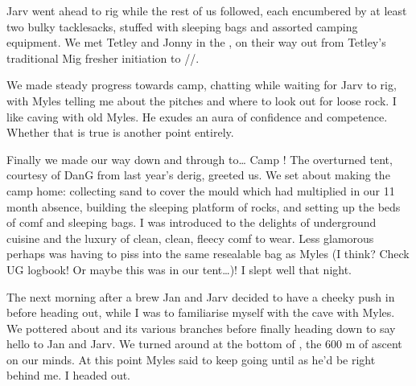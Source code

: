 
Jarv went ahead to rig while the rest of us followed, each encumbered by
at least two bulky tacklesacks, stuffed with sleeping bags and assorted
camping equipment. We met Tetley and Jonny in the ,
on their way out from Tetley's traditional Mig fresher initiation to
//.


We made steady progress towards camp, chatting while waiting for Jarv to
rig, with Myles telling me about the pitches and where to look out for
loose rock. I like caving with old Myles. He exudes an aura of
confidence and competence. Whether that is true is another point
entirely.

Finally we made our way down  and through  to\ldots{} Camp ! The overturned tent, courtesy of
DanG from last year's derig, greeted us. We set about making the camp
home: collecting sand to cover the mould which had multiplied in our 11
month absence, building the sleeping platform of rocks, and setting up
the beds of comf and sleeping bags. I was introduced to the delights of
underground cuisine and the luxury of clean, clean, fleecy comf to wear.
Less glamorous perhaps was having to piss into the same resealable bag
as Myles (I think? Check UG logbook! Or maybe this was in our
tent\ldots{})! I slept well that night.



The next morning after a brew Jan and Jarv decided to have a cheeky push
in  before heading out, while I was to familiarise
myself with the cave with Myles. We pottered about 
and its various branches before finally heading down 
to say hello to Jan and Jarv. We turned around at the bottom of , the 600 m of ascent on our minds. At this point Myles said
to keep going until  as he'd be right behind me.
I headed out.

